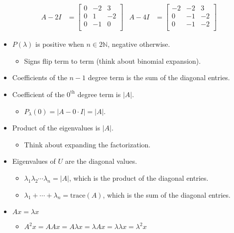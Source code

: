 \documentclass{article}
\begin{document}
\begin{itemize}
\begin{align*}
        A-2I &=
        \begin{bmatrix}
            0 & -2 & 3\\
            0 & 1 & -2\\
            0 & -1 & 0\\
        \end{bmatrix}&
        A-4I &=
        \begin{bmatrix}
            -2 & -2 & 3\\
            0 & -1 & -2\\
            0 & -1 & -2\\
        \end{bmatrix}&
    \end{align*}
    \item $P(\lambda)$ is positive when $n\in 2\mathbb{N}$, negative otherwise.
    \begin{itemize}
        \item Signs flip term to term (think about binomial expansion).
    \end{itemize}
    \item Coefficients of the $n-1$ degree term is the sum of the diagonal entries.
    \item Coefficient of the $0^\text{th}$ degree term is $|A|$.
    \begin{itemize}
        \item $P_\lambda(0) = |A-0\cdot I| = |A|$.
    \end{itemize}
    \item Product of the eigenvalues is $|A|$.
    \begin{itemize}
        \item Think about expanding the factorization.
    \end{itemize}
    \item Eigenvalues of $U$ are the diagonal values.
    \begin{itemize}
        \item $\lambda_1\lambda_2\cdots\lambda_n=|A|$, which is the product of the diagonal entries.
        \item $\lambda_1+\cdots+\lambda_n=\text{trace}(A)$, which is the sum of the diagonal entries.
    \end{itemize}
    \item $Ax=\lambda x$
    \begin{itemize}
        \item $A^2x=AAx=A\lambda x=\lambda Ax=\lambda\lambda x=\lambda^2x$
    \end{itemize}
\end{itemize}
\end{document}
